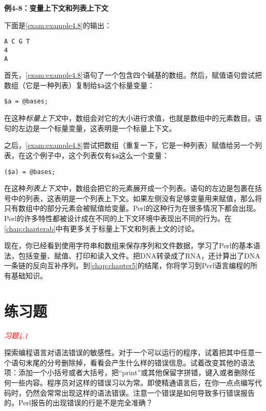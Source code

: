 \textbf{例4-8：变量上下文和列表上下文}



下面是\autoref{exam:example4.8}的输出：

\begin{lstlisting}
A C G T
4
A
\end{lstlisting}

首先，\autoref{exam:example4.8}语句了一个包含四个碱基的数组。然后，赋值语句尝试把数组（它是一种列表）复制给\verb|$a|这个标量变量： 

\begin{lstlisting}
$a = @bases;
\end{lstlisting}

在这种\textit{标量上下文}中，数组会对它的大小进行求值，也就是数组中的元素数目。语句的左边是一个标量变量，这表明是一个标量上下文。

之后，\autoref{exam:example4.8}尝试把数组（重复一下，它是一种列表）赋值给另一个列表，在这个例子中，这个列表仅有\verb|$a|这么一个变量：

\begin{lstlisting}
($a) = @bases;
\end{lstlisting}

在这种\textit{列表上下文}中，数组会把它的元素展开成一个列表。语句的左边是包裹在括号中的列表，这表明是一个列表上下文。如果左侧没有足够变量用来赋值，那么将只有数组中的部分元素会被赋值给变量。Perl的这种行为在很多情况下都会出现。Perl的许多特性都被设计成在不同的上下文环境中表现出不同的行为。在\autoref{chap:chapterab}中有更多关于标量上下文和列表上文的讨论。

现在，你已经看到使用字符串和数组来保存序列和文件数据，学习了Perl的基本语法，包括变量、赋值、打印和读入文件。把DNA转录成了RNA，还计算出了DNA一条链的反向互补序列。到\autoref{chap:chapter5}的结尾，你将学习到Perl语言编程的所有基础知识。

\section{练习题}
\noindent
\textcolor{red}{\textit{习题4.1}}
\begin{adjustwidth}{1cm}{}
探索编程语言对语法错误的敏感性。对于一个可以运行的程序，试着把其中任意一个语句末尾的分号删除掉，看看会产生什么样的错误信息。试着改变其他的语法项：添加一个小括号或者大括号，把“print”或其他保留字拼错，键入或者删除任何一些内容。程序员对这样的错误习以为常。即使精通语言后，在你一点点编写代码时，仍然会常常出现这样的语法错误。注意一个错误是如何导致多行错误报告的。Perl报告的出现错误的行是不是完全准确？
\end{adjustwidth}

